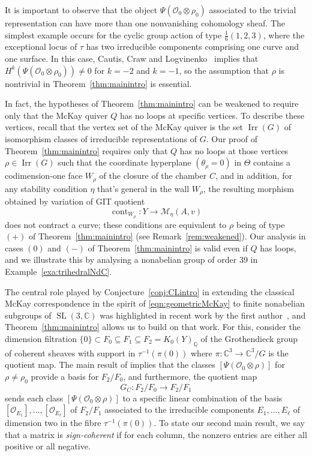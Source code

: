 \documentclass[11pt,reqno]{amsart}
\numberwithin{equation}{section}
\theoremstyle{definition}
\newcommand{\CC}{\ensuremath{\mathbb{C}}}
\newcommand{\QQ}{\ensuremath{\mathbb{Q}}}
\newcommand{\cont}{\operatorname{cont}}
\newcommand{\0}{\operatorname{0}}
\newcommand{\Irr}{\operatorname{Irr}}
\newcommand{\SL}{\operatorname{SL}}
\begin{document}
 It is important to observe that the object $\Psi(\mathcal{O}_0\otimes \rho_0)$ associated to the trivial representation can have more than one nonvanishing cohomology sheaf. The simplest example occurs for the cyclic group action of type $\frac{1}{6}(1,2,3)$, where the exceptional locus of $\tau$ has two irreducible components comprising one curve and one surface. In this case, Cautis,  Craw and Logvinenko~\cite[Theorem~1.2]{CCL17} implies that  $H^k(\Psi(\mathcal{O}_0\otimes \rho_0))\neq 0$ for $k=-2$ and $k=-1$, so the assumption that $\rho$ is nontrivial in Theorem~\ref{thm:mainintro} is  essential. 
 
 In fact, the hypotheses of  Theorem~\ref{thm:mainintro} can be weakened to require only that the McKay quiver $Q$ has no loops at specific vertices. To describe these vertices, recall that the vertex set of the McKay quiver is the set $\Irr(G)$ of isomorphism classes of irreducible representations of $G$. Our proof of Theorem~\ref{thm:mainintro} requires only that $Q$ has no loops at those vertices $\rho\in \Irr(G)$ such that the coordinate hyperplane $(\theta_\rho=0)$ in $\Theta$ contains a codimension-one face $W_\rho$ of the closure of the chamber $C$, and in addition, for any stability condition $\eta$ that's general in the wall $W_\rho$, the resulting morphism obtained by variation of GIT quotient 
 \begin{equation}
\cont_{W_\rho}\colon Y\longrightarrow \mathcal{M}_\eta(A,v)
 \end{equation}
 does not contract a curve; these conditions are equivalent to $\rho$ being of type \ensuremath{(+)} of Theorem~\ref{thm:mainintro} (see Remark~\ref{rem:weakened}). Our analysis in cases \ensuremath{(0)} and \ensuremath{(-)} of Theorem~\ref{thm:mainintro} is valid even if $Q$ has loops, and we illustrate this by analysing a nonabelian group of order 39 in Example~\ref{exa:trihedralNdC}.

 \medskip

The central role played by Conjecture~\ref{conj:CLintro} in extending the classical McKay correspondence in the spirit of \eqref{eqn:geometricMcKay} to finite nonabelian subgroups of $\SL(3,\mathbb{C})$ was highlighted in recent work by the first author~\cite[Section~6]{C21}, and Theorem~\ref{thm:mainintro} allows us to build on that work. For this, consider the dimension filtration $\{0\}\subset F_0\subseteq F_1\subseteq F_2=K_0(Y)_{\QQ}$ of the Grothendieck group of coherent sheaves with support in $\tau^{-1}(\pi(0))$ where $\pi\colon \CC^3\to \CC^3/G$ is the quotient map.
   The main result of \cite[Theorem~1.1]{C21} implies  that the classes 
 $[\Psi(\mathcal{O}_0\otimes\rho)]$ for $\rho\neq \rho_0$ provide a basis for $F_2/F_0$, and furthermore, the quotient map 
 \[
 G_C\colon F_2/F_0\longrightarrow F_2/F_1
 \]
sends each class $[\Psi(\mathcal{O}_0\otimes\rho)]$ to a specific linear combination of the basis $[\mathcal{O}_{E_1}], \dots, [\mathcal{O}_{E_\ell}]$ of $F_2/F_1$ associated to the irreducible components $E_1, \dots, E_\ell$ of dimension two in the fibre $\tau^{-1}(\pi(0))$. To state our second main result, we say that a matrix is \emph{sign-coherent} if for each column, the nonzero entries are either all positive or all negative. 
\end{document}
